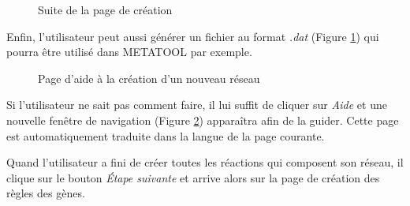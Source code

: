 \begin{figure}[!ht]
	\begin{center}
		\caption{Suite de la page de création}
  		\label{creation2}
  	\end{center}	
\end{figure}

Enfin, l'utilisateur peut aussi générer un fichier au format \emph{.dat} (Figure \ref{creation2}) qui pourra être utilisé dans METATOOL par exemple.\\

\begin{figure}[!ht]
	\begin{center}
		\caption{Page d'aide à la création d'un nouveau réseau}
  		\label{helpCreation}
  	\end{center}	
\end{figure}

Si l'utilisateur ne sait pas comment faire, il lui suffit de cliquer sur \textit{Aide} et une nouvelle fen\^etre de navigation (Figure \ref{helpCreation}) appara\^itra afin de la guider. Cette page est automatiquement traduite dans la langue de la page courante. 

Quand l'utilisateur a fini de créer toutes les réactions qui composent son réseau, il clique sur le bouton \emph{\'Etape suivante} et arrive alors sur la page de création des règles des gènes.

